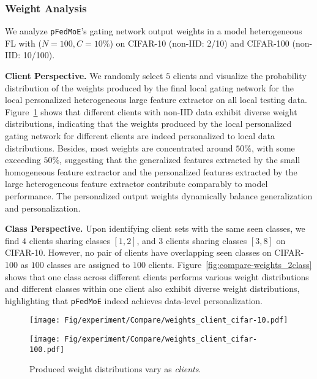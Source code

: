 \documentclass[sigconf]{acmart}
\newcommand{\hetero}{heterogeneous }
\newcommand{\homo}{homogeneous }
\newcommand{\pers}{personalized }
\newcommand{\gen}{generalized }
\newcommand{\genN}{generalization }
\newcommand{\methodname}{{\tt{pFedMoE}}}
\begin{document}
\subsubsection{Weight Analysis} 
We analyze \methodname{}'s gating network output weights in a model \hetero FL with ($N=100, C=10\%$) on CIFAR-10 (non-IID: 2/10) and CIFAR-100 (non-IID: 10/100).

\textbf{Client Perspective.} We randomly select $5$ clients and visualize the probability distribution of the weights produced by the final local gating network for the local \pers \hetero large feature extractor on all local testing data. 
Figure~\ref{fig:compare-weights_clients} shows that different clients with non-IID data exhibit diverse weight distributions, indicating that the weights produced by the local \pers gating network for different clients are indeed \pers to local data distributions. Besides, most weights are concentrated around $50\%$, with some exceeding $50\%$, suggesting that the \gen features extracted by the small \homo feature extractor and the \pers features extracted by the large \hetero feature extractor contribute comparably to model performance. The \pers output weights dynamically balance \genN and personalization.

\textbf{Class Perspective.} Upon identifying client sets with the same seen classes,
we find $4$ clients sharing classes $[1, 2]$, and $3$ clients sharing classes $[3, 8]$ on CIFAR-10. However, no pair of clients have overlapping seen classes on CIFAR-100 as $100$ classes are assigned to $100$ clients. Figure~\ref{fig:compare-weights_2class} shows that one class across different clients performs various weight distributions and different classes within one client also exhibit diverse weight distributions, highlighting that \methodname{} indeed achieves data-level personalization.




\begin{figure}[t]
\centering
\begin{minipage}[t]{0.5\linewidth}
\centering
\texttt{[image: Fig/experiment/Compare/weights\_client\_cifar-10.pdf]}
\end{minipage}%
\begin{minipage}[t]{0.5\linewidth}
\centering
\texttt{[image: Fig/experiment/Compare/weights\_client\_cifar-100.pdf]}
\end{minipage}%
\caption{Produced weight distributions vary as \textit{clients}.}
\label{fig:compare-weights_clients}
\end{figure}
\end{document}
